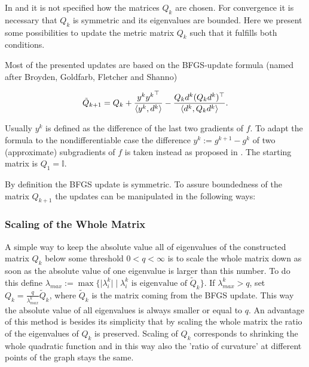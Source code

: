 
In \cite{Noll2012} and \cite{Noll2013} it is not specified how the matrices \(Q_k\) are chosen.
For convergence it is necessary that \(Q_k\) is symmetric and its eigenvalues are bounded. %
Here we present some possibilities to update the metric matrix \(Q_k\) such that it fulfills both conditions.

Most of the presented updates are based on the BFGS-update formula (named after Broyden, Goldfarb, Fletcher and Shanno)

\begin{equation}
	\tilde{Q}_{k+1} = Q_k + \frac{y^k{y^k}^{\top}}{\left\langle y^k,d^k\right\rangle}-\frac{Q_kd^k(Q_kd^k)^{\top}}{\left\langle d^k,Q_kd^k \right\rangle}.
	\label{BFGS_update}
\end{equation}

Usually \(y^k\) is defined as the difference of the last two gradients of \(f\). To adapt the formula to the nondifferentiable case the difference \(y^k := g^{k+1}-g^k\) of two (approximate) subgradients of \(f\) is taken instead as proposed in \cite{Haarala2007}.
The starting matrix is \(Q_1 = \mathbb{I}\).


By definition the BFGS update is symmetric. To assure boundedness of the matrix \(Q_{k+1}\) the updates can be manipulated in the following ways:

\subsubsection{Scaling of the Whole Matrix}
\label{update_1}

A simple way to keep the absolute value all of eigenvalues of the constructed matrix \(Q_k\) below some threshold \(0 < q < \infty\) is to scale the whole matrix down as soon as the absolute value of one eigenvalue is larger than this number.
To do this define \(\lambda_{max} := \max\{\vert\lambda_i^k\vert \mid \lambda^k_i \text{ is eigenvalue of } \tilde{Q}_k \}\). If  \(\lambda^k_{max} > q\), set \(Q_k = \frac{q}{\lambda^k_{max}}\tilde{Q}_k\), where \(\tilde{Q}_k\) is the matrix coming from the BFGS update. This way the absolute value of all eigenvalues is always smaller or equal to \(q\).
An advantage of this method is besides its simplicity that by scaling the whole matrix the ratio of the eigenvalues of \(Q_k\) is preserved. Scaling of \(Q_k\) corresponds to shrinking the whole quadratic function and in this way also the 'ratio of curvature' at different points of the graph stays the same. 

